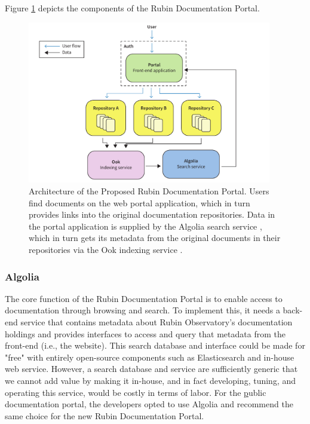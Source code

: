 Figure \ref{fig:portal-architecture} depicts the components of the Rubin Documentation Portal.

\begin{figure}[hp!]
\centering
\includegraphics[width=0.95\textwidth]{portal-architecture}
\caption{Architecture of the Proposed Rubin Documentation Portal.
Users find documents on the web portal application, which in turn provides links into the original documentation repositories.
Data in the portal application is supplied by the Algolia search service \citep{Algolia-cite}, which in turn gets its metadata from the original documents in their repositories via the Ook indexing service \citep{ook-cite}.}
\label{fig:portal-architecture}
\end{figure}

\subsubsection{Algolia}

The core function of the Rubin Documentation Portal is to enable access to documentation through browsing and search.
To implement this, it needs a back-end service that contains metadata about Rubin Observatory's documentation holdings and provides interfaces to access and query that metadata from the front-end (i.e., the website).
This search database and interface could be made for "free" with entirely open-source components such as Elasticsearch \citep{elastic-cite} and in-house web service.
However, a search database and service are sufficiently generic that we cannot add value by making it in-house, and in fact developing, tuning, and operating this service, would be costly in terms of labor.
For the \href{www.lsst.io} public documentation portal, the developers opted to use Algolia and recommend the same choice for the new Rubin Documentation Portal.

